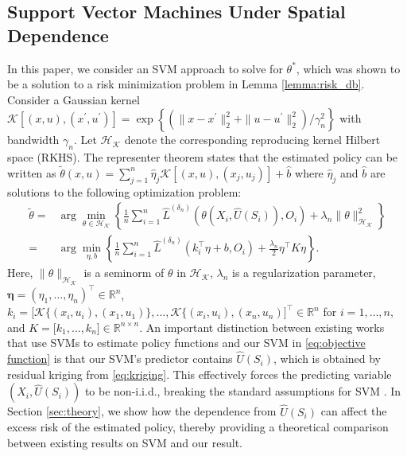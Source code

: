 \documentclass[12pt]{article}
\newcommand{\R}{\mathbb{R}}
\begin{document}
\subsection{Support Vector Machines Under Spatial Dependence} \label{subsec:SVM}
In this paper, we consider an SVM approach to solve for $\theta^*$, which was shown to be a solution to a risk minimization problem in Lemma \ref{lemma:risk_db}. Consider a Gaussian kernel  $\mathcal{K}[(x,u),(x^{'},u^{'})] = \exp\left\{(\|x-x^\prime\|_2^2 + \|u - u^\prime\|_2^2)/\gamma_n^2\right\}$ with bandwidth $\gamma_n$. Let $\mathcal{H}_\mathcal{K}$ denote the corresponding reproducing kernel Hilbert space (RKHS). The representer theorem \citep{KW1970,SHS2001} states that the estimated policy can be written as $\widetilde\theta(x,u) = \sum_{j=1}^n \widehat\eta_j\mathcal{K}[(x,u),(x_j,u_j)]+\widehat b$ where $\widehat\eta_j$ and $\widehat b$ are solutions to the following optimization problem:
\begin{align}
    \widetilde\theta = & \arg\min_{\theta\in\mathcal{H}_\mathcal{K}}\left\{\frac{1}{n}\sum_{i=1}^n \widehat L^{({\delta_n})}(\theta(X_i,\widehat U(S_i)),O_i)+\lambda_n\|\theta\|^2_{\mathcal{H}_\mathcal{K}}\right\} \nonumber\\
    =& \arg\min_{\eta,b}\left\{\frac{1}{n}\sum_{i=1}^n \widehat L^{({\delta_n})}(k_i^\top\eta+b,O_i)+\frac{\lambda_n}{2}\eta^\top K\eta\right\}. \label{eq:objective function} 
\end{align}
Here, $\|\theta\|_{\mathcal{H}_\mathcal{K}}$ is a seminorm of $\theta$ in $\mathcal{H}_\mathcal{K}$, $\lambda_n$ is a regularization parameter, $\mathbf{\eta} = ( \eta_1,\ldots,\eta_n )^\top \in \R^{n}$, $k_i = \big[ \mathcal{K}\{(x_i,u_i),(x_1,u_1)\} , \ldots, \mathcal{K}\{(x_i,u_i),(x_n,u_n) \big]^\top \in \R^{n}$ for $i=1,\ldots,n$, and $K = \big[ k_1,\ldots,k_n \big] \in \R^{n \times n}$. An important distinction between existing works that use SVMs to estimate policy functions \citep{chen2022policy,park2024minimum} and our SVM in \eqref{eq:objective function} is that our SVM's predictor contains $\widehat U(S_i)$, which is obtained by residual kriging from \eqref{eq:kriging}. This effectively forces the predicting variable $(X_i,\widehat U(S_i))$ to be non-i.i.d., breaking the standard assumptions for SVM \citep{christmann2008support}. In Section \ref{sec:theory}, we show how the dependence from $\widehat U(S_i)$ can affect the excess risk of the estimated policy, thereby providing a theoretical comparison between existing results on SVM and our result.
\end{document}
